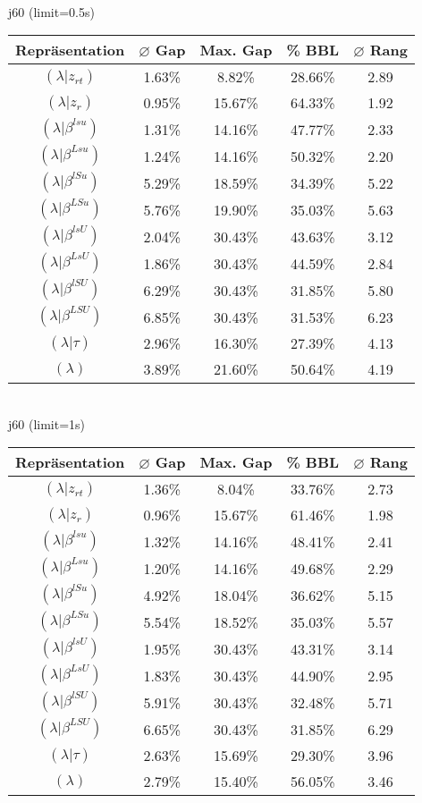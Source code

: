 \documentclass{scrartcl}
\begin{document}
\\[8pt]
\newpage
j60 (limit=0.5s)\\\begin{tabular}{ccccc}
\hline
Repräsentation & $\varnothing$ Gap & Max. Gap & \% BBL & $\varnothing$ Rang\\[3pt]
\hline
$(\lambda|z_{rt})$&1.63\%&8.82\%&28.66\%&2.89\\
\hline
$(\lambda|z_r)$&0.95\%&15.67\%&64.33\%&1.92\\
\hline
$(\lambda|\beta^{lsu})$&1.31\%&14.16\%&47.77\%&2.33\\
\hline
$(\lambda|\beta^{Lsu})$&1.24\%&14.16\%&50.32\%&2.20\\
\hline
$(\lambda|\beta^{lSu})$&5.29\%&18.59\%&34.39\%&5.22\\
\hline
$(\lambda|\beta^{LSu})$&5.76\%&19.90\%&35.03\%&5.63\\
\hline
$(\lambda|\beta^{lsU})$&2.04\%&30.43\%&43.63\%&3.12\\
\hline
$(\lambda|\beta^{LsU})$&1.86\%&30.43\%&44.59\%&2.84\\
\hline
$(\lambda|\beta^{lSU})$&6.29\%&30.43\%&31.85\%&5.80\\
\hline
$(\lambda|\beta^{LSU})$&6.85\%&30.43\%&31.53\%&6.23\\
\hline
$(\lambda|\tau)$&2.96\%&16.30\%&27.39\%&4.13\\
\hline
$(\lambda)$&3.89\%&21.60\%&50.64\%&4.19\\\hline
\end{tabular}
\\[8pt]j60 (limit=1s)\\\begin{tabular}{ccccc}
\hline
Repräsentation & $\varnothing$ Gap & Max. Gap & \% BBL & $\varnothing$ Rang\\[3pt]
\hline
$(\lambda|z_{rt})$&1.36\%&8.04\%&33.76\%&2.73\\
\hline
$(\lambda|z_r)$&0.96\%&15.67\%&61.46\%&1.98\\
\hline
$(\lambda|\beta^{lsu})$&1.32\%&14.16\%&48.41\%&2.41\\
\hline
$(\lambda|\beta^{Lsu})$&1.20\%&14.16\%&49.68\%&2.29\\
\hline
$(\lambda|\beta^{lSu})$&4.92\%&18.04\%&36.62\%&5.15\\
\hline
$(\lambda|\beta^{LSu})$&5.54\%&18.52\%&35.03\%&5.57\\
\hline
$(\lambda|\beta^{lsU})$&1.95\%&30.43\%&43.31\%&3.14\\
\hline
$(\lambda|\beta^{LsU})$&1.83\%&30.43\%&44.90\%&2.95\\
\hline
$(\lambda|\beta^{lSU})$&5.91\%&30.43\%&32.48\%&5.71\\
\hline
$(\lambda|\beta^{LSU})$&6.65\%&30.43\%&31.85\%&6.29\\
\hline
$(\lambda|\tau)$&2.63\%&15.69\%&29.30\%&3.96\\
\hline
$(\lambda)$&2.79\%&15.40\%&56.05\%&3.46\\\hline
\end{tabular}
\end{document}
